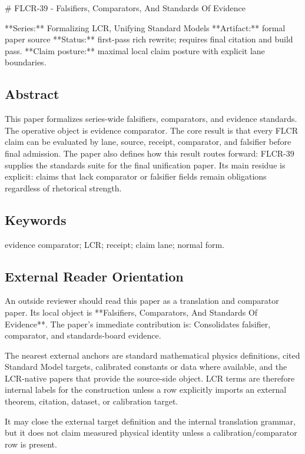 \documentclass[11pt]{article}
\begin{document}
﻿\# FLCR-39 - Falsifiers, Comparators, And Standards Of Evidence

**Series:** Formalizing LCR, Unifying Standard Models
**Artifact:** formal paper source
**Status:** first-pass rich rewrite; requires final citation and build pass.
**Claim posture:** maximal local claim posture with explicit lane boundaries.

\subsection*{Abstract}

This paper formalizes series-wide falsifiers, comparators, and evidence standards. The operative object is evidence comparator. The core result is that every FLCR claim can be evaluated by lane, source, receipt, comparator, and falsifier before final admission. The paper also defines how this result routes forward: FLCR-39 supplies the standards suite for the final unification paper. Its main residue is explicit: claims that lack comparator or falsifier fields remain obligations regardless of rhetorical strength.

\subsection*{Keywords}

evidence comparator; LCR; receipt; claim lane; normal form.

\subsection*{External Reader Orientation}

An outside reviewer should read this paper as a translation and comparator paper. Its local object is **Falsifiers, Comparators, And Standards Of Evidence**. The paper's immediate contribution is: Consolidates falsifier, comparator, and standards-board evidence.

The nearest external anchors are standard mathematical physics definitions, cited Standard Model targets, calibrated constants or data where available, and the LCR-native papers that provide the source-side object. LCR terms are therefore internal labels for the construction unless a row explicitly imports an external theorem, citation, dataset, or calibration target.

It may close the external target definition and the internal translation grammar, but it does not claim measured physical identity unless a calibration/comparator row is present.
\end{document}
